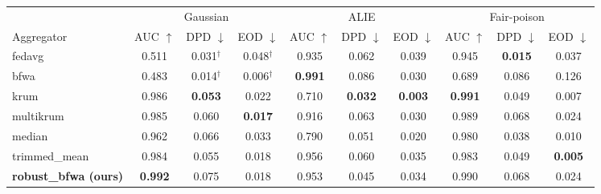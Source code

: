 \begin{tabular}{lccccccccc}
\toprule
 & \multicolumn{3}{c}{Gaussian} & \multicolumn{3}{c}{ALIE} & \multicolumn{3}{c}{Fair-poison} \\
Aggregator & AUC $\uparrow$ & DPD $\downarrow$ & EOD $\downarrow$ & AUC $\uparrow$ & DPD $\downarrow$ & EOD $\downarrow$ & AUC $\uparrow$ & DPD $\downarrow$ & EOD $\downarrow$ \\
\midrule
fedavg & 0.511 & 0.031$^{\dagger}$ & 0.048$^{\dagger}$ & 0.935 & 0.062 & 0.039 & 0.945 & \textbf{0.015} & 0.037 \\
bfwa & 0.483 & 0.014$^{\dagger}$ & 0.006$^{\dagger}$ & \textbf{0.991} & 0.086 & 0.030 & 0.689 & 0.086 & 0.126 \\
krum & 0.986 & \textbf{0.053} & 0.022 & 0.710 & \textbf{0.032} & \textbf{0.003} & \textbf{0.991} & 0.049 & 0.007 \\
multikrum & 0.985 & 0.060 & \textbf{0.017} & 0.916 & 0.063 & 0.030 & 0.989 & 0.068 & 0.024 \\
median & 0.962 & 0.066 & 0.033 & 0.790 & 0.051 & 0.020 & 0.980 & 0.038 & 0.010 \\
trimmed\_mean & 0.984 & 0.055 & 0.018 & 0.956 & 0.060 & 0.035 & 0.983 & 0.049 & \textbf{0.005} \\
\textbf{robust\_bfwa (ours)} & \textbf{0.992} & 0.075 & 0.018 & 0.953 & 0.045 & 0.034 & 0.990 & 0.068 & 0.024 \\
\bottomrule
\end{tabular}